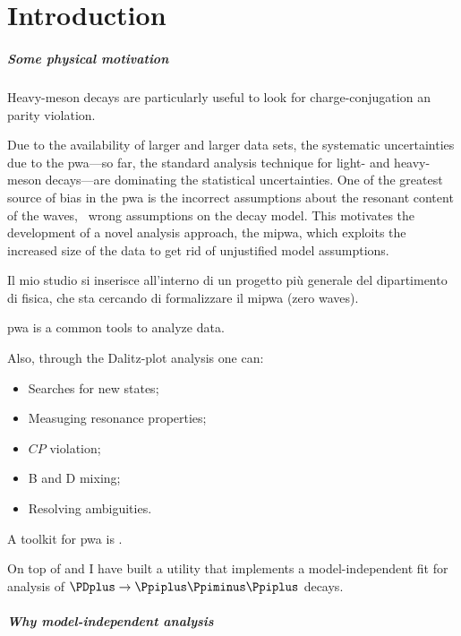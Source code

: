 \chapter{Introduction}


    \paragraph{Some physical motivation}

    Heavy-meson decays are particularly useful to look for charge-conjugation an parity violation.


    Due to the availability of larger and larger data sets, the systematic uncertainties due to the \ac{pwa}---so far, the standard analysis technique for light- and heavy-meson decays---are dominating the statistical uncertainties.
    One of the greatest source of bias in the \ac{pwa} is the incorrect assumptions about the resonant content of the waves, \ie~wrong assumptions on the decay model.
    This motivates the development of a novel analysis approach, the \ac{mipwa}, which exploits the increased size of the data to get rid of unjustified model assumptions.
    

    Il mio studio si inserisce all'interno di un progetto più generale del dipartimento di fisica, che sta cercando di formalizzare il \ac{mipwa} (zero waves).


    \Ac{pwa} is a common tools to analyze data.


    Also, through the Dalitz-plot analysis one can:
    \begin{itemize}
        \item Searches for new states;
        \item Measuging resonance properties;
        \item $CP$ violation;
        \item B and D mixing;
        \item Resolving ambiguities.
    \end{itemize}

    A toolkit for \ac{pwa} is .

    On top of  and  I have built a utility that implements a model-independent fit for analysis of $\PDplus\to\Ppiplus\Ppiminus\Ppiplus$ decays.

    \paragraph{Why model-independent analysis}

